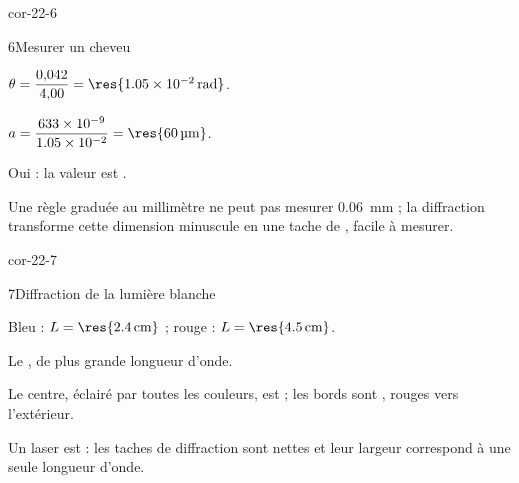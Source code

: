\begin{blocLivre}{cor-22-6}
\begin{corrige}{6}{Mesurer un cheveu}
\begin{questions}
\item $\theta=\dfrac{0{,}042}{4{,}00}=\res{\qty{1,05e-2}{rad}}$.
\item $a=\dfrac{\num{633e-9}}{\num{1.05e-2}}=\res{\qty{60}{\micro m}}$.
\item Oui : la valeur est .
\item Une règle graduée au millimètre ne peut pas mesurer \qty{0,06}{mm} ; la diffraction transforme cette dimension
minuscule en une tache de , facile à mesurer.
\end{questions}
\end{corrige}
\end{blocLivre}
\begin{blocLivre}{cor-22-7}
\begin{corrige}{7}{Diffraction de la lumière blanche}
\begin{questions}
\item Bleu : $L=\res{\qty{2,4}{cm}}$ ; rouge : $L=\res{\qty{4,5}{cm}}$.
\item Le , de plus grande longueur d'onde.
\item Le centre, éclairé par toutes les couleurs, est  ; les bords sont , rouges vers
l'extérieur.
\item Un laser est  : les taches de diffraction sont nettes et leur largeur correspond à une seule
longueur d'onde.
\end{questions}
\end{corrige}
\end{blocLivre}
